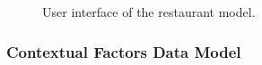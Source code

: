 \begin{figure}
\captionsetup{justification=centering,margin=2cm,font=footnotesize}
\centering
\setlength\fboxsep{0pt}
\setlength\fboxrule{0.7pt}
\caption{User interface of the restaurant model.}
\label{fig:restaurantmodel}       
\end{figure}
\subsubsection{Contextual Factors Data Model} \label{datamodelsection}   

